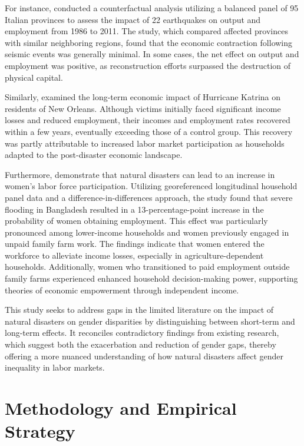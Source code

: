 \documentclass[a4paper,12pt]{article}
\begin{document}
For instance, \citet{Porcelli2019TheItaly} conducted a counterfactual analysis utilizing a balanced panel of 95 Italian provinces to assess the impact of 22 earthquakes on output and employment from 1986 to 2011. The study, which compared affected provinces with similar neighboring regions, found that the economic contraction following seismic events was generally minimal. In some cases, the net effect on output and employment was positive, as reconstruction efforts surpassed the destruction of physical capital.

Similarly, \citet{Deryugina2018TheReturns} examined the long-term economic impact of Hurricane Katrina on residents of New Orleans. Although victims initially faced significant income losses and reduced employment, their incomes and employment rates recovered within a few years, eventually exceeding those of a control group. This recovery was partly attributable to increased labor market participation as households adapted to the post-disaster economic landscape.

Furthermore, \citet{Canessa2021WomensShocks} demonstrate that natural disasters can lead to an increase in women's labor force participation. Utilizing georeferenced longitudinal household panel data and a difference-in-differences approach, the study found that severe flooding in Bangladesh resulted in a 13-percentage-point increase in the probability of women obtaining employment. This effect was particularly pronounced among lower-income households and women previously engaged in unpaid family farm work. The findings indicate that women entered the workforce to alleviate income losses, especially in agriculture-dependent households. Additionally, women who transitioned to paid employment outside family farms experienced enhanced household decision-making power, supporting theories of economic empowerment through independent income.

This study seeks to address gaps in the limited literature on the impact of natural disasters on gender disparities by distinguishing between short-term and long-term effects. It reconciles contradictory findings from existing research, which suggest both the exacerbation and reduction of gender gaps, thereby offering a more nuanced understanding of how natural disasters affect gender inequality in labor markets.




\section{Methodology and Empirical Strategy}
\end{document}
